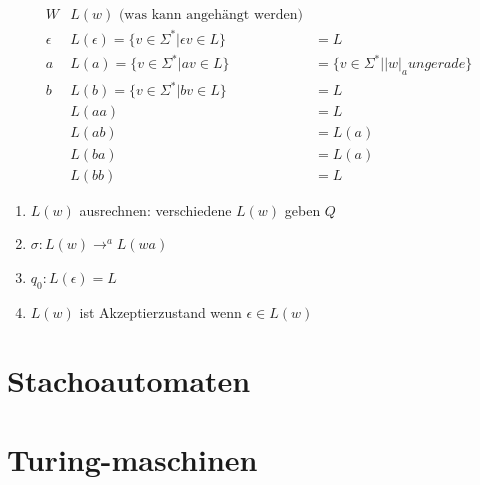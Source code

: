 \begin{align*}
W & L(w) \text{ (was kann angehängt werden)}\\
\epsilon & L(\epsilon) = \{v \in \Sigma^\ast | \epsilon v \in L \} &= L \\
a & L(a) = \{v \in \Sigma^\ast | a v \in L \} &= \{ v \in \Sigma^\ast | |w|_a ungerade \}\\
b & L(b) = \{v \in \Sigma^\ast | b v \in L \} &= L\\
  & L(aa) &= L \\
  & L(ab) &= L(a) \\
  & L(ba) &= L(a) \\
  & L(bb) &= L
\end{align*}

\begin{enumerate}
	\item $L(w)$ ausrechnen: verschiedene $L(w)$ geben $Q$ 
	\item $\sigma: L(w) \rightarrow^a L(wa)$
	\item $q_0: L(\epsilon) = L$
	\item $L(w)$ ist Akzeptierzustand wenn $\epsilon \in L(w)$
\end{enumerate}
\section{Stachoautomaten}

\section{Turing-maschinen}

